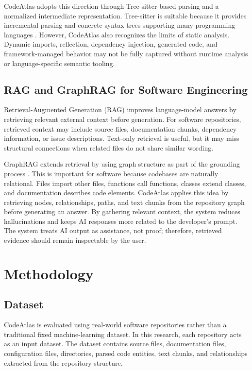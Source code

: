 \documentclass[conference]{IEEEtran}
\begin{document}
CodeAtlas adopts this direction through Tree-sitter-based parsing and a normalized intermediate representation. Tree-sitter is suitable because it provides incremental parsing and concrete syntax trees supporting many programming languages \cite{treesitter}. However, CodeAtlas also recognizes the limits of static analysis. Dynamic imports, reflection, dependency injection, generated code, and framework-managed behavior may not be fully captured without runtime analysis or language-specific semantic tooling.

\subsection{RAG and GraphRAG for Software Engineering}
Retrieval-Augmented Generation (RAG) improves language-model answers by retrieving relevant external context before generation. For software repositories, retrieved context may include source files, documentation chunks, dependency information, or issue descriptions. Text-only retrieval is useful, but it may miss structural connections when related files do not share similar wording.

GraphRAG extends retrieval by using graph structure as part of the grounding process \cite{edge2025graphrag}. This is important for software because codebases are naturally relational. Files import other files, functions call functions, classes extend classes, and documentation describes code elements. CodeAtlas applies this idea by retrieving nodes, relationships, paths, and text chunks from the repository graph before generating an answer. By gathering relevant context, the system reduces hallucinations and keeps AI responses more related to the developer's prompt. The system treats AI output as assistance, not proof; therefore, retrieved evidence should remain inspectable by the user.

\section{Methodology}

\subsection{Dataset}
CodeAtlas is evaluated using real-world software repositories rather than a traditional fixed machine-learning dataset. In this research, each repository acts as an input dataset. The dataset contains source files, documentation files, configuration files, directories, parsed code entities, text chunks, and relationships extracted from the repository structure.
\end{document}
